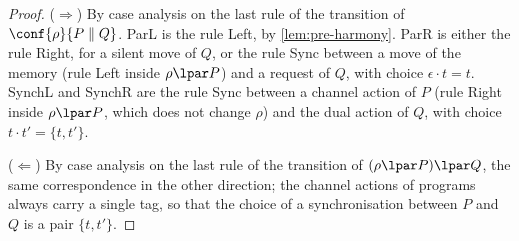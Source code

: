 \begin{proof}
($\Rightarrow$) By case analysis on the last rule of the transition of
$\conf{\rho}{P \parallel Q}$. ParL is the rule Left, by
\cref{lem:pre-harmony}. ParR is either the rule Right, for a silent move of
$Q$, or the rule Sync between a move of the memory (rule Left inside
$\rho \lpar P$) and a request of $Q$, with choice $\epsilon \cdot t = t$.
SynchL and SynchR are the rule Sync between a channel action of $P$ (rule
Right inside $\rho \lpar P$, which does not change $\rho$) and the dual action
of $Q$, with choice $t \cdot t' = \{t,t'\}$.

($\Leftarrow$) By case analysis on the last rule of the transition of
$(\rho \lpar P) \lpar Q$, the same correspondence in the other direction;
the channel actions of programs always carry a single tag, so that the choice
of a synchronisation between $P$ and $Q$ is a pair $\{t,t'\}$.
\end{proof}
